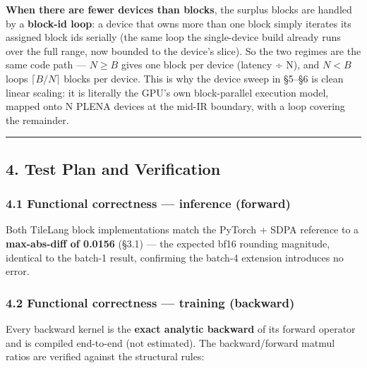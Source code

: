 \documentclass[
  10pt,
]{article}
\begin{document}
\textbf{When there are fewer devices than blocks}, the surplus blocks are
handled by a \textbf{block-id loop}: a device that owns more than one block
simply iterates its assigned block ids serially (the same loop the
single-device build already runs over the full range, now bounded to the
device's slice). So the two regimes are the same code path —
\(N \geq B\) gives one block per device (latency ÷ N), and \(N < B\) loops
\(\lceil B/N\rceil\) blocks per device. This is why the device sweep in
§5--§6 is clean linear scaling: it is literally the GPU's own block-parallel
execution model, mapped onto N PLENA devices at the mid-IR boundary, with a
loop covering the remainder.

\begin{center}\rule{0.5\linewidth}{0.5pt}\end{center}

\subsection{4. Test Plan and
Verification}\label{test-plan-and-verification}

\subsubsection{4.1 Functional correctness --- inference
(forward)}\label{correctness-inference}

Both TileLang block implementations match the PyTorch + SDPA reference to
a \textbf{max-abs-diff of 0.0156} (§3.1) --- the expected bf16 rounding
magnitude, identical to the batch-1 result, confirming the batch-4
extension introduces no error.

\subsubsection{4.2 Functional correctness --- training
(backward)}\label{correctness-training}

Every backward kernel is the \textbf{exact analytic backward} of its
forward operator and is compiled end-to-end (not estimated). The
backward/forward matmul ratios are verified against the structural rules:
\end{document}
